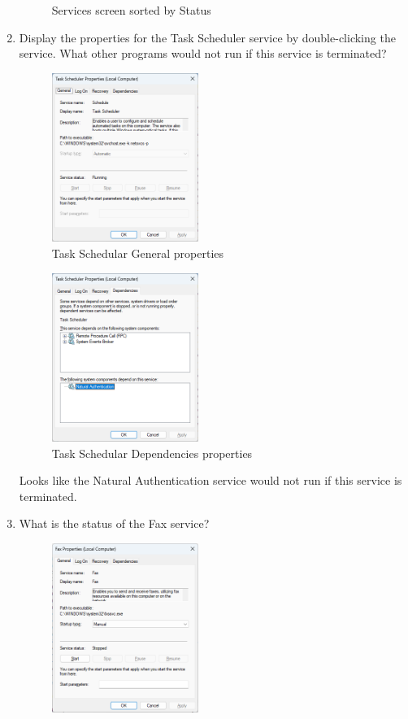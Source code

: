 \documentclass[12pt]{article}
\newenvironment{problem}[2][Problem]{\begin{trivlist}
\item[\hskip \labelsep {\bfseries #1}\hskip \labelsep {\bfseries #2.}]}{\end{trivlist}}
\begin{document}
\begin{problem}{1}
\begin{enumerate}
\begin{figure}[H]
        \caption{Services screen sorted by Status}
    \end{figure}
    \pagebreak
    \item Display the properties for the Task Scheduler service by double-clicking the service. What other programs
    would not run if this service is terminated?
    \begin{figure}[H]
        \centering
        \includegraphics[width=0.45\textwidth]{task_scheduler_general}
        \caption{Task Schedular General properties}
    \end{figure}
    \begin{figure}[H]
        \centering
        \includegraphics[width=0.45\textwidth]{task_scheduler_dependencies}
        \caption{Task Schedular Dependencies properties}
    \end{figure}
    Looks like the Natural Authentication service would not run if this service is terminated.
    \pagebreak
    \item What is the status of the Fax service?
    \begin{figure}[H]
        \centering
        \includegraphics[width=0.45\textwidth]{fax_general}

\end{figure}
\end{enumerate}
\end{problem}
\end{document}
